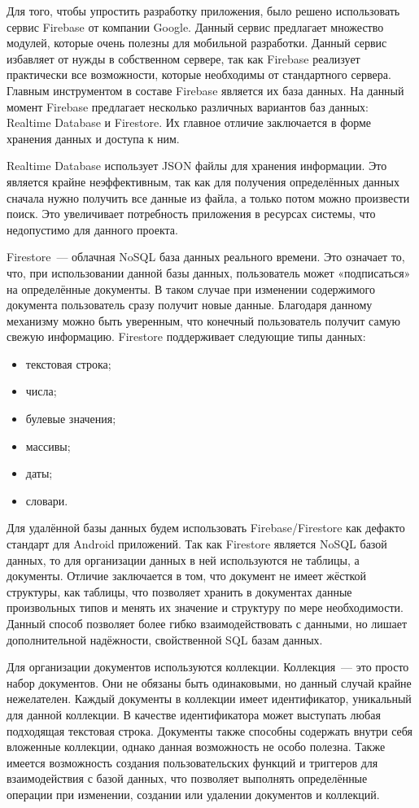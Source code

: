 Для того, чтобы упростить разработку приложения, было решено использовать сервис Firebase от компании Google. Данный сервис предлагает множество модулей, которые очень полезны для мобильной разработки. Данный сервис избавляет от нужды в собственном сервере, так как Firebase реализует практически все возможности, которые необходимы от стандартного сервера. Главным инструментом в составе Firebase является их база данных. На данный момент Firebase предлагает несколько различных вариантов баз данных: Realtime Database и Firestore. Их главное отличие заключается в форме хранения данных и доступа к ним. 

Realtime Database использует JSON файлы для хранения информации. Это является крайне неэффективным, так как для получения определённых данных сначала нужно получить все данные из файла, а только потом можно произвести поиск. Это увеличивает потребность приложения в ресурсах системы, что недопустимо для данного проекта. 

Firestore~--- облачная NoSQL база данных реального времени. Это означает то, что, при использовании данной базы данных, пользователь может «подписаться» на определённые документы. В таком случае при изменении содержимого документа пользователь сразу получит новые данные. Благодаря данному механизму можно быть уверенным, что конечный пользователь получит самую свежую информацию. Firestore поддерживает следующие типы данных:

\begin{itemize}
    \item текстовая строка;
    \item числа;
    \item булевые значения;
    \item массивы;
    \item даты;
    \item словари.
\end{itemize}

Для удалённой базы данных будем использовать Firebase/Firestore как дефакто стандарт для Android приложений. Так как Firestore является NoSQL базой данных, то для организации данных в ней используются не таблицы, а документы. Отличие заключается в том, что документ не имеет жёсткой структуры, как таблицы, что позволяет хранить в документах данные произвольных типов и менять их значение и структуру по мере необходимости. Данный способ позволяет более гибко взаимодействовать с данными, но лишает дополнительной надёжности, свойственной SQL базам данных.

Для организации документов используются коллекции. Коллекция~--- это просто набор документов. Они не обязаны быть одинаковыми, но данный случай крайне нежелателен. Каждый документы в коллекции имеет идентификатор, уникальный для данной коллекции. В качестве идентификатора может выступать любая подходящая текстовая строка. Документы также способны содержать внутри себя вложенные коллекции, однако данная возможность не особо полезна. Также имеется возможность создания пользовательских функций и триггеров для взаимодействия с базой данных, что позволяет выполнять определённые операции при изменении, создании или удалении документов и коллекций. 

